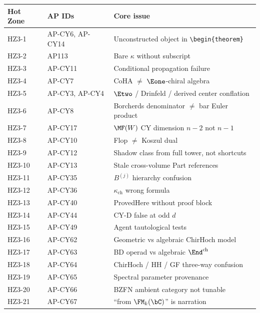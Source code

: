 \begin{center}
\begin{tabular}{@{}lll@{}}
\toprule
\textbf{Hot Zone} & \textbf{AP IDs} & \textbf{Core issue} \\
\midrule
HZ3-1 & AP-CY6, AP-CY14 & Unconstructed object in
  \verb|\begin{theorem}| \\
HZ3-2 & AP113 & Bare $\kappa$ without subscript \\
HZ3-3 & AP-CY11 & Conditional propagation failure \\
HZ3-4 & AP-CY7 & CoHA $\neq$ $\Eone$-chiral algebra \\
HZ3-5 & AP-CY3, AP-CY4 & $\Etwo$ / Drinfeld / derived center
  conflation \\
HZ3-6 & AP-CY8 & Borcherds denominator $\neq$ bar Euler product \\
HZ3-7 & AP-CY17 & $\MF(W)$ CY dimension $n - 2$ not $n - 1$ \\
HZ3-8 & AP-CY10 & Flop $\neq$ Koszul dual \\
HZ3-9 & AP-CY12 & Shadow class from full tower, not shortcuts \\
HZ3-10 & AP-CY13 & Stale cross-volume Part references \\
\midrule
HZ3-11 & AP-CY35 & $B^{(j)}$ hierarchy confusion \\
HZ3-12 & AP-CY36 & $\kappa_{\mathrm{ch}}$ wrong formula \\
HZ3-13 & AP-CY40 & ProvedHere without proof block \\
HZ3-14 & AP-CY44 & CY-D false at odd $d$ \\
HZ3-15 & AP-CY49 & Agent tautological tests \\
\midrule
HZ3-16 & AP-CY62 & Geometric vs algebraic ChirHoch model \\
HZ3-17 & AP-CY63 & BD operad vs algebraic $\End^{\mathrm{ch}}$ \\
HZ3-18 & AP-CY64 & ChirHoch / HH / GF three-way confusion \\
HZ3-19 & AP-CY65 & Spectral parameter provenance \\
HZ3-20 & AP-CY66 & BZFN ambient category not tunable \\
HZ3-21 & AP-CY67 & ``from $\FM_k(\bC)$'' is narration \\
\bottomrule
\end{tabular}
\end{center}
